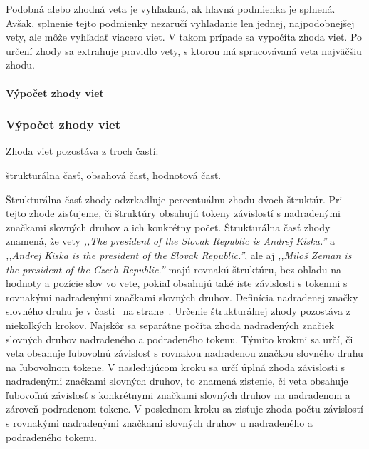 Podobná alebo zhodná veta je vyhľadaná, ak hlavná podmienka je splnená. Avšak, splnenie tejto podmienky nezaručí vyhľadanie len jednej, najpodobnejšej vety, ale môže vyhľadať viacero viet. V takom prípade sa vypočíta zhoda viet. Po určení zhody sa extrahuje pravidlo vety, s ktorou má spracovávaná veta najväčšiu zhodu.

%
%
{
	\paragraph{Výpočet zhody viet}
}
{
	\subsubsection{Výpočet zhody viet}
}
\label{paragraph:sentences_match}

Zhoda viet pozostáva z troch častí:
\begin{my_itemize}
	\myitem štrukturálna časť,
	\myitem obsahová časť,
	\myitem hodnotová časť.
\end{my_itemize}

Štrukturálna časť zhody odzrkadľuje percentuálnu zhodu dvoch štruktúr. Pri tejto zhode zisťujeme, či štruktúry obsahujú tokeny závislostí s nadradenými značkami slovných druhov a ich konkrétny počet. Štrukturálna časť zhody znamená, že vety \textit{,,The president of the Slovak Republic is Andrej Kiska.''} a \textit{,,Andrej Kiska is the president of the Slovak Republic.''}, ale aj \textit{,,Miloš Zeman is the president of the Czech Republic.''} majú rovnakú štruktúru, bez ohľadu na hodnoty a pozície slov vo vete, pokiaľ obsahujú také iste závislosti s tokenmi s rovnakými nadradenými značkami slovných druhov. Definícia nadradenej značky slovného druhu je v časti~ na strane~\pageref{paragraph:superior_pos_tag}. Určenie štrukturálnej zhody pozostáva z niekoľkých krokov. Najskôr sa separátne počíta zhoda nadradených značiek slovných druhov nadradeného a podradeného tokenu. Týmito krokmi sa určí, či veta obsahuje ľubovolnú závislosť s rovnakou nadradenou značkou slovného druhu na ľubovolnom tokene. V nasledujúcom kroku sa určí úplná zhoda závislosti s nadradenými značkami slovných druhov, to znamená zistenie, či veta obsahuje ľubovoľnú závislosť s konkrétnymi značkami slovných druhov na nadradenom a zároveň podradenom tokene. V poslednom kroku sa zisťuje zhoda počtu závislostí s rovnakými nadradenými značkami slovných druhov u nadradeného a podradeného tokenu. \\

